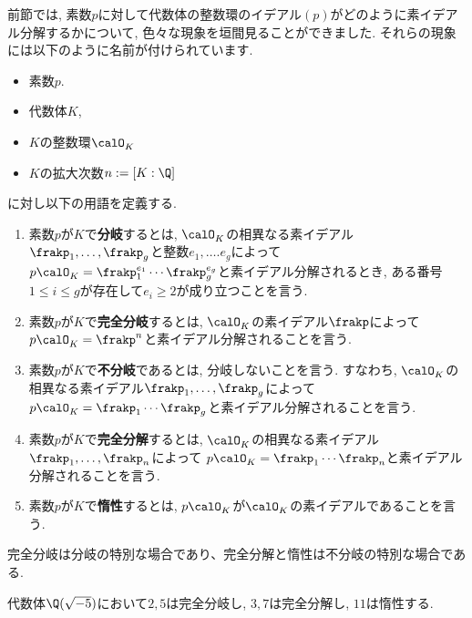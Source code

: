 \documentclass[11pt,b5paper,oneside,titlepage,lualatex]{ltjsreport}
\numberwithin{equation}{section} %
\begin{document}

前節では, 素数$ p $に対して代数体の整数環のイデアル$ (p) $がどのように素イデアル分解するかについて, 色々な現象を垣間見ることができました. 
それらの現象には以下のように名前が付けられています. 

\begin{dfn}{}{}
	\begin{itemize}
		\item 素数$ p $.
		\item 代数体$ K $,
		\item $ K $の整数環$ \calO_K^{} $
		\item $ K $の拡大次数$ n := [K : \Q] $
	\end{itemize}
	に対し以下の用語を定義する. 
	\begin{enumerate}
		\item 素数$ p $が$ K $で\textbf{分岐}するとは, $ \calO_K^{} $の相異なる素イデアル$ \frakp_1, \dots, \frakp_g $と整数$ e_1, \dots. e_g $によって
		$ p \calO_K^{} = \frakp_1^{e_1} \cdots \frakp_g^{e_g} $と素イデアル分解されるとき, ある番号$ 1 \le i \le g $が存在して$ e_i \ge 2 $が成り立つことを言う. 
		\item 素数$ p $が$ K $で\textbf{完全分岐}するとは, $ \calO_K^{} $の素イデアル$ \frakp $によって
		$ p \calO_K^{} = \frakp^{n} $と素イデアル分解されることを言う. 
		\item 素数$ p $が$ K $で\textbf{不分岐}であるとは, 分岐しないことを言う. 
		すなわち, $ \calO_K^{} $の相異なる素イデアル$ \frakp_1, \dots, \frakp_g $によって
		$ p \calO_K^{} = \frakp_1 \cdots \frakp_g $と素イデアル分解されることを言う. 
		\item 素数$ p $が$ K $で\textbf{完全分解}するとは, $ \calO_K^{} $の相異なる素イデアル$ \frakp_1, \dots, \frakp_n $によって
		$ p \calO_K^{} = \frakp_1 \cdots \frakp_n $と素イデアル分解されることを言う. 
		\item 素数$ p $が$ K $で\textbf{惰性}するとは, $ p \calO_K^{} $が$ \calO_K^{} $の素イデアルであることを言う. 
	\end{enumerate}
\end{dfn}

\begin{rem}{}{}
	完全分岐は分岐の特別な場合であり、完全分解と惰性は不分岐の特別な場合である. 
\end{rem}

\begin{ex}{}{}
	代数体$ \Q(\sqrt{-5}) $において$ 2, 5 $は完全分岐し, $ 3, 7 $は完全分解し, $ 11 $は惰性する. 
\end{ex}
\end{document}
